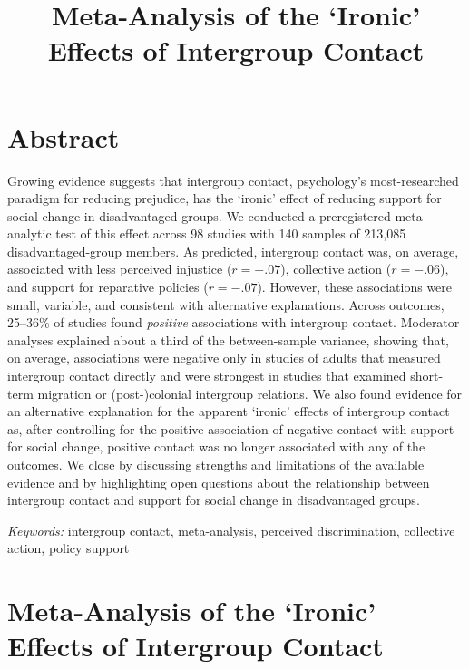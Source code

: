 \documentclass[12pt, letterpaper]{article}
\title{ Meta-Analysis of the `Ironic' Effects of Intergroup Contact }
\begin{document}
% 

\section{Abstract}

\noindent Growing evidence suggests that intergroup contact, psychology's
most-researched paradigm for reducing prejudice, has the `ironic' effect
of reducing support for social change in disadvantaged groups. We
conducted a preregistered meta-analytic test of this effect across 98
studies with 140 samples of 213,085 disadvantaged-group members. As
predicted, intergroup contact was, on average, associated with less
perceived injustice (\(r = -.07\)), collective action (\(r = -.06\)),
and support for reparative policies (\(r = -.07\)). However, these
associations were small, variable, and consistent with alternative
explanations. Across outcomes, 25--36\% of studies found \emph{positive}
associations with intergroup contact. Moderator analyses explained about
a third of the between-sample variance, showing that, on average,
associations were negative only in studies of adults that measured
intergroup contact directly and were strongest in studies that examined
short-term migration or (post-)colonial intergroup relations. We also
found evidence for an alternative explanation for the apparent `ironic'
effects of intergroup contact as, after controlling for the positive
association of negative contact with support for social change, positive
contact was no longer associated with any of the outcomes. We close by
discussing strengths and limitations of the available evidence and by
highlighting open questions about the relationship between intergroup
contact and support for social change in disadvantaged groups.

\textit{Keywords:} intergroup contact, meta-analysis, perceived discrimination, collective
action, policy support

\newpage

\section{Meta-Analysis of the `Ironic' Effects of Intergroup Contact}
\end{document}
